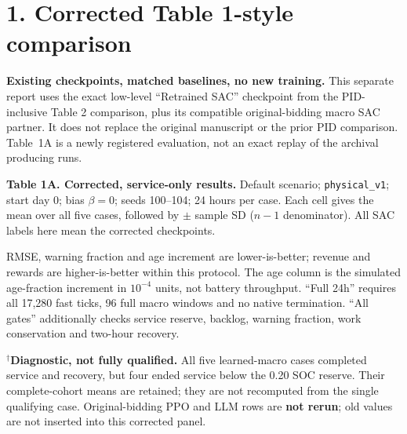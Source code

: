 \documentclass[10pt]{article}
\begin{document}
\section*{1. Corrected Table 1-style comparison}
\textbf{Existing checkpoints, matched baselines, no new training.}
This separate report uses the exact low-level ``Retrained SAC'' checkpoint
from the PID-inclusive Table 2 comparison, plus its compatible original-bidding
macro SAC partner. It does not replace the original manuscript or the prior
PID comparison. Table~1A is a newly registered evaluation, not an exact replay
of the archival producing runs.

\textbf{Table 1A. Corrected, service-only results.}
Default scenario; \texttt{physical\_v1}; start day 0; bias $\beta=0$;
seeds 100--104; 24 hours per case. Each cell gives the mean over all five
cases, followed by $\pm$ sample SD ($n-1$ denominator).
All SAC labels here mean the corrected checkpoints.
\begin{center}\small
\CorrectedServiceTable
\end{center}

RMSE, warning fraction and age increment are lower-is-better; revenue and
rewards are higher-is-better within this protocol. The age column is the
simulated age-fraction increment in $10^{-4}$ units, not battery throughput.
``Full 24h'' requires all 17,280 fast ticks, 96 full macro windows and no
native termination. ``All gates'' additionally checks service reserve,
backlog, warning fraction, work conservation and two-hour recovery.

$^\dagger$\textbf{Diagnostic, not fully qualified.}
All five learned-macro cases completed service and recovery, but four ended
service below the 0.20 SOC reserve. Their complete-cohort means are retained;
they are not recomputed from the single qualifying case.
Original-bidding PPO and LLM rows are \textbf{not rerun}; old values are not
inserted into this corrected panel.
\end{document}
